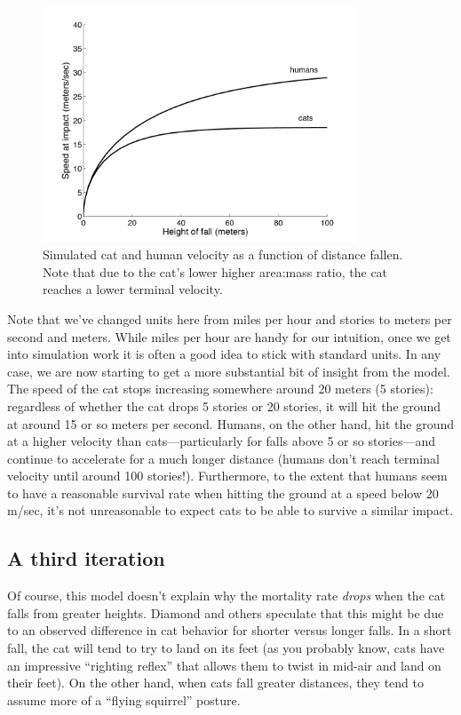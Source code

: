 \begin{figure}

\centerline{\includegraphics[height=7cm]{figs/CatSpeed}}
\caption{Simulated cat and human velocity as a function of distance fallen.  Note that due to the cat's lower higher area:mass ratio, the cat reaches a lower terminal velocity. }

\end{figure}

Note that we've changed units here from miles per hour and stories to
meters per second and meters.  While miles per hour are handy for our
intuition, once we get into simulation work it is often a good idea to
stick with standard units.  In any case, we are now starting to get a
more substantial bit of insight from the model.  The speed of the cat
stops increasing somewhere around 20 meters (5 stories): regardless of
whether the cat drops 5 stories or 20 stories, it will hit the ground
at around 15 or so meters per second.  Humans, on the other hand, hit
the ground at a higher velocity than cats---particularly for falls
above 5 or so stories---and continue to accelerate for a much longer
distance (humans don't reach terminal velocity until around 100
stories!).  Furthermore, to the extent that humans seem to have a
reasonable survival rate when hitting the ground at a speed below 20
m/sec, it's not unreasonable to expect cats to be able to survive a
similar impact.

\subsection{A third iteration}

Of course, this model doesn't explain why the mortality rate {\it
  drops} when the cat falls from greater heights.  Diamond and others
speculate that this might be due to an observed difference in cat
behavior for shorter versus longer falls.  In a short fall, the cat
will tend to try to land on its feet (as you probably know, cats have
an impressive ``righting reflex'' that allows them to twist in mid-air
and land on their feet).  On the other hand, when cats fall greater
distances, they tend to assume more of a ``flying squirrel'' posture.

